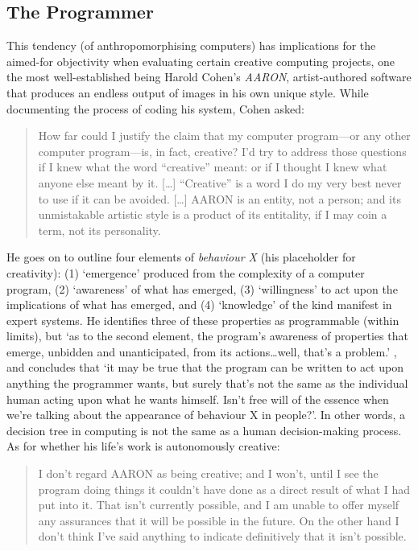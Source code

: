 \subsection{The Programmer}
\label{s:programmer}

This tendency (of anthropomorphising computers) has implications for the aimed-for objectivity when evaluating certain creative computing projects, one the most well-established being Harold Cohen's \emph{AARON}, artist-authored software that produces an endless output of images in his own unique style. While documenting the process of coding his system, Cohen asked:

\begin{quotation}
  How far could I justify the claim that my computer program---or any other computer program---is, in fact, creative? I'd try to address those questions if I knew what the word ``creative'' meant: or if I thought I knew what anyone else meant by it. [\ldots] ``Creative'' is a word I do my very best never to use if it can be avoided. [\ldots] AARON is an entity, not a person; and its unmistakable artistic style is a product of its entitality, if I may coin a term, not its personality. 
\end{quotation}

He goes on to outline four elements of \emph{behaviour X} (his placeholder for creativity): (1) `emergence' produced from the complexity of a computer program, (2) `awareness' of what has emerged, (3) `willingness' to act upon the implications of what has emerged, and (4) `knowledge' of the kind manifest in expert systems. He identifies three of these properties as programmable (within limits), but `as to the second element, the program\rq s awareness of properties that emerge, unbidden and unanticipated, from its actions\ldots  well, that\rq s a problem.' \autocite{Cohen1999}, and concludes that `it may be true that the program can be written to act upon anything the programmer wants, but surely that\rq s not the same as the individual human acting upon what he wants himself. Isn\rq t free will of the essence when we\rq re talking about the appearance of behaviour X in people?'. In other words, a decision tree in computing is not the same as a human decision-making process. As for whether his life's work is autonomously creative:

\begin{quotation}
  I don't regard AARON as being creative; and I won't, until I see the program doing things it couldn't have done as a direct result of what I had put into it. That isn't currently possible, and I am unable to offer myself any assurances that it will be possible in the future. On the other hand I don't think I've said anything to indicate definitively that it isn't possible. 
\end{quotation}

